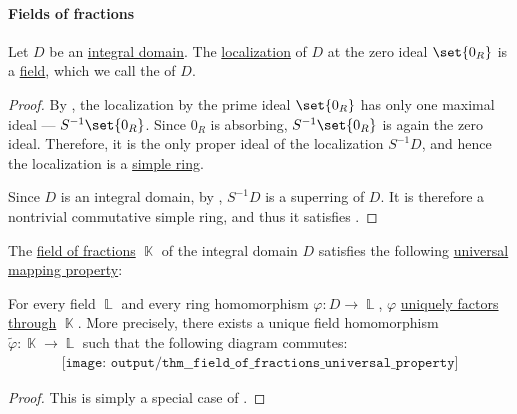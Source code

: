 \paragraph{Fields of fractions}

\begin{proposition}\label{thm:field_of_fractions}
  Let \( D \) be an \hyperref[def:integral_domain]{integral domain}. The \hyperref[def:ring_localization]{localization} of \( D \) at the zero ideal \( \set{ 0_R } \) is a \hyperref[def:field]{field}, which we call the  of \( D \).
\end{proposition}
\begin{proof}
  By , the localization by the prime ideal \( \set{ 0_R } \) has only one maximal ideal --- \( S^{-1} \set{ 0_R } \). Since \( 0_R \) is absorbing, \( S^{-1} \set{ 0_R } \) is again the zero ideal. Therefore, it is the only proper ideal of the localization \( S^{-1} D \), and hence the localization is a \hyperref[def:simple_object]{simple ring}.

  Since \( D \) is an integral domain, by , \( S^{-1} D \) is a superring of \( D \). It is therefore a nontrivial commutative simple ring, and thus it satisfies .
\end{proof}

\begin{theorem}\label{thm:field_of_fractions_universal_property}
  The \hyperref[thm:field_of_fractions]{field of fractions} \( \BbbK \) of the integral domain \( D \) satisfies the following \hyperref[rem:universal_mapping_property]{universal mapping property}:
  \begin{displayquote}
    For every field \( \BbbL \) and every ring homomorphism \( \varphi: D \to \BbbL \), \( \varphi \) \hyperref[def:factors_through]{uniquely factors through} \( \BbbK \). More precisely, there exists a unique field homomorphism \( \widetilde{\varphi}: \BbbK \to \BbbL \) such that the following diagram commutes:
    \begin{equation}\label{eq:thm:field_of_fractions_universal_property/diagram}
      \begin{aligned}
        \texttt{[image: output/thm\_\_field\_of\_fractions\_universal\_property]}
      \end{aligned}
    \end{equation}
  \end{displayquote}
\end{theorem}
\begin{proof}
  This is simply a special case of .
\end{proof}

